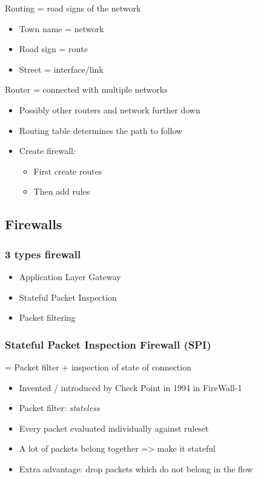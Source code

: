 \documentclass{article}
\begin{document}
Routing = road signs of the network

\begin{itemize}
    \item Town name = network
    \item Road sign = route
    \item Street = interface/link
\end{itemize}

Router = connected with multiple networks

\begin{itemize}
    \item Possibly other routers and network further down
    \item Routing table determines the path to follow
    \item Create firewall:
    \begin{itemize}
        \item First create routes
        \item Then add rules
    \end{itemize}
\end{itemize}


\subsection{Firewalls}

\subsubsection{3 types firewall}

\begin{itemize}
    \item Application Layer Gateway
    \item Stateful Packet Inspection
    \item Packet filtering
\end{itemize}

\subsubsection{Stateful Packet Inspection Firewall (SPI)}

= Packet filter + inspection of state of connection

\begin{itemize}
    \item Invented / introduced by Check Point in 1994 in FireWall-1
    \item Packet filter: \textit{stateless}
    \item Every packet evaluated individually against ruleset
    \item A lot of packets belong together => make it stateful
    \item Extra advantage: drop packets which do not belong in the flow
\end{itemize}
\end{document}
